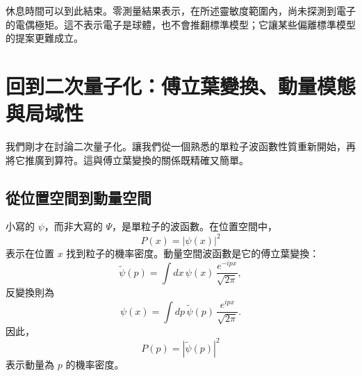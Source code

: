 \begin{classroomqa}
\end{classroomqa}

\begin{classroomqa}
\end{classroomqa}

休息時間可以到此結束。零測量結果表示，在所述靈敏度範圍內，尚未探測到電子的電偶極矩。這不表示電子是球體，也不會推翻標準模型；它讓某些偏離標準模型的提案更難成立。

\section{回到二次量子化：傅立葉變換、動量模態與局域性}

我們剛才在討論二次量子化。讓我們從一個熟悉的單粒子波函數性質重新開始，再將它推廣到算符。這與傅立葉變換的關係既精確又簡單。

\subsection{從位置空間到動量空間}

小寫的 \(\psi\)，而非大寫的 \(\Psi\)，是單粒子的波函數。在位置空間中，
\begin{equation}
P(x)=|\psi(x)|^2
\end{equation}
表示在位置 \(x\) 找到粒子的機率密度。動量空間波函數是它的傅立葉變換：
\begin{equation}
\tilde{\psi}(p)=\int dx\,\psi(x)\,\frac{e^{-ipx}}{\sqrt{2\pi}},
\end{equation}
反變換則為
\begin{equation}
\psi(x)=\int dp\,\tilde{\psi}(p)\,\frac{e^{ipx}}{\sqrt{2\pi}}.
\end{equation}
因此，
\begin{equation}
P(p)=|\tilde{\psi}(p)|^2
\end{equation}
表示動量為 \(p\) 的機率密度。

